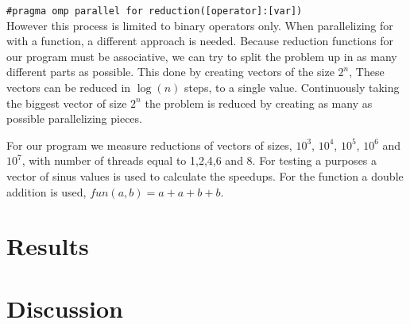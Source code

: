 \documentclass[a4paper,12px]{article}
\begin{document}
\texttt{\#pragma omp parallel for reduction([operator]:[var])}\\

However this process is limited to binary operators only. When parallelizing for
with a function, a different approach is needed.  Because reduction functions
for our program must be associative, we can try to split the problem up in as
many different parts as possible. This done by creating vectors of the size
$2^n$, These vectors can be reduced in $\log(n)$ steps, to a single value.
Continuously taking the biggest vector of size $2^n$ the problem is reduced by
creating as many as possible parallelizing pieces.

For our program we measure reductions of vectors of sizes, $10^3$, $10^4$,
$10^5$, $10^6$ and $10^7$, with number of threads equal to 1,2,4,6 and 8. For
testing a purposes a vector of sinus values is used to calculate the speedups.
For the function a double addition is used, $fun(a,b) = a+a+b+b$.

\section{Results}

\section{Discussion}




%
%
\end{document}
